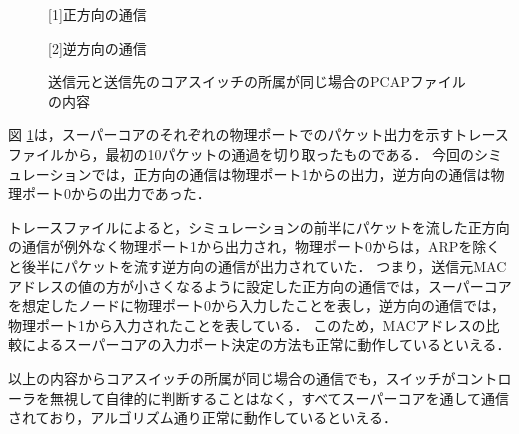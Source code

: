 \begin{figure}[tb]
	\begin{center}
		
		\begin{center}
			\hspace{1.6cm} [1]正方向の通信
		\end{center}
		
		\begin{center}
			\hspace{1.6cm} [2]逆方向の通信
		\end{center}
		\caption{送信元と送信先のコアスイッチの所属が同じ場合のPCAPファイルの内容}
		\label{fig:4-6}
	\end{center}
\end{figure}

図 \ref{fig:4-6}は，スーパーコアのそれぞれの物理ポートでのパケット出力を示すトレースファイルから，最初の10パケットの通過を切り取ったものである．
今回のシミュレーションでは，正方向の通信は物理ポート1からの出力，逆方向の通信は物理ポート0からの出力であった．

トレースファイルによると，シミュレーションの前半にパケットを流した正方向の通信が例外なく物理ポート1から出力され，物理ポート0からは，ARPを除くと後半にパケットを流す逆方向の通信が出力されていた．
つまり，送信元MACアドレスの値の方が小さくなるように設定した正方向の通信では，スーパーコアを想定したノードに物理ポート0から入力したことを表し，逆方向の通信では，物理ポート1から入力されたことを表している．
このため，MACアドレスの比較によるスーパーコアの入力ポート決定の方法も正常に動作しているといえる．

以上の内容からコアスイッチの所属が同じ場合の通信でも，スイッチがコントローラを無視して自律的に判断することはなく，すべてスーパーコアを通して通信されており，アルゴリズム通り正常に動作しているといえる．

